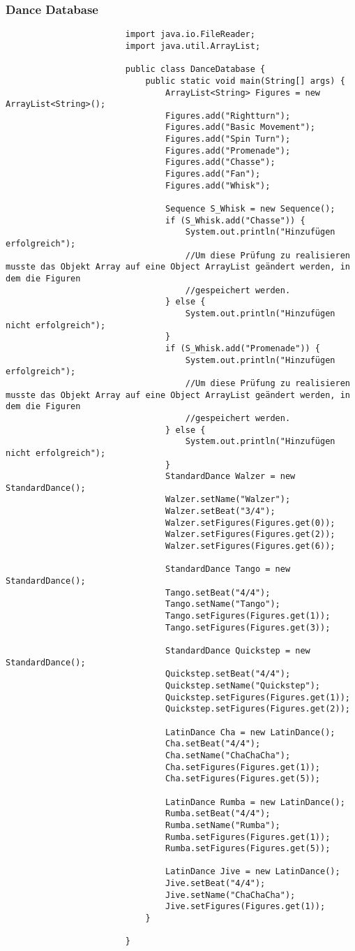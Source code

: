 \documentclass[12pt,a4paper,oneside,ngerman]{article}
\begin{document}
				\subsubsection{Dance Database}
					\begin{verbatim}
						import java.io.FileReader;
						import java.util.ArrayList;

						public class DanceDatabase {
							public static void main(String[] args) {
								ArrayList<String> Figures = new ArrayList<String>();
								Figures.add("Rightturn");
								Figures.add("Basic Movement");
								Figures.add("Spin Turn");
								Figures.add("Promenade");
								Figures.add("Chasse");
								Figures.add("Fan");
								Figures.add("Whisk");
						
								Sequence S_Whisk = new Sequence();
								if (S_Whisk.add("Chasse")) {
									System.out.println("Hinzufügen erfolgreich");
									//Um diese Prüfung zu realisieren musste das Objekt Array auf eine Object ArrayList geändert werden, in dem die Figuren
									//gespeichert werden.
								} else {
									System.out.println("Hinzufügen nicht erfolgreich");
								}
								if (S_Whisk.add("Promenade")) {
									System.out.println("Hinzufügen erfolgreich");
									//Um diese Prüfung zu realisieren musste das Objekt Array auf eine Object ArrayList geändert werden, in dem die Figuren
									//gespeichert werden.
								} else {
									System.out.println("Hinzufügen nicht erfolgreich");
								}
								StandardDance Walzer = new StandardDance();
								Walzer.setName("Walzer");
								Walzer.setBeat("3/4");
								Walzer.setFigures(Figures.get(0));
								Walzer.setFigures(Figures.get(2));
								Walzer.setFigures(Figures.get(6));
						
								StandardDance Tango = new StandardDance();
								Tango.setBeat("4/4");
								Tango.setName("Tango");
								Tango.setFigures(Figures.get(1));
								Tango.setFigures(Figures.get(3));
						
								StandardDance Quickstep = new StandardDance();
								Quickstep.setBeat("4/4");
								Quickstep.setName("Quickstep");
								Quickstep.setFigures(Figures.get(1));
								Quickstep.setFigures(Figures.get(2));
						
								LatinDance Cha = new LatinDance();
								Cha.setBeat("4/4");
								Cha.setName("ChaChaCha");
								Cha.setFigures(Figures.get(1));
								Cha.setFigures(Figures.get(5));
						
								LatinDance Rumba = new LatinDance();
								Rumba.setBeat("4/4");
								Rumba.setName("Rumba");
								Rumba.setFigures(Figures.get(1));
								Rumba.setFigures(Figures.get(5));
						
								LatinDance Jive = new LatinDance();
								Jive.setBeat("4/4");
								Jive.setName("ChaChaCha");
								Jive.setFigures(Figures.get(1));
							}
						
						}

					\end{verbatim}
\end{document}

